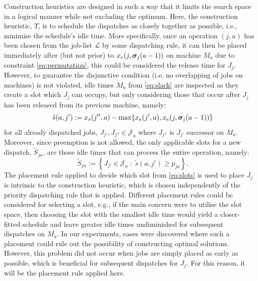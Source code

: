 \documentclass[twocolumn]{svjour3}
\begin{document}
Construction heuristics are designed in such a way that it limits the search 
space in a logical manner while not excluding the optimum. Here, the 
construction heuristic, $\Upsilon$, is to schedule the dispatches as closely 
together as possible, i.e., minimise the schedule's idle time. 
More specifically, once an operation $(j,a)$ has been chosen from the job-list 
$\mathcal{L}$ by some dispatching rule, it can then be placed immediately after 
(but not prior) to $x_e(j,\bm \sigma_j(a-1))$ on machine $M_a$ due to constraint 
\cref{eq:permutation}, this could be considered the release time for $J_j$. 
However, to guarantee the disjunctive condition (i.e. no overlapping of jobs on 
machines) is not violated, idle times $M_a$ from \cref{eq:slack} are inspected 
as they create a slot which $J_j$ can occupy, but only considering those that 
occur after $J_j$ has been released from its previous machine, namely:
\begin{equation}\quad
\tilde{s}(a,j'):= x_s(j'',a)-\max\{x_e(j',a),x_e(j,\bm \sigma_j(a-1))\} 
\end{equation}
for all already dispatched jobs, $J_{j'},J_{j''}\in \mathcal{J}_a$ where 
$J_{j''}$ is $J_{j'}$ successor on $M_a$. Moreover, since preemption is not 
allowed, the only applicable slots for a new dispatch, $\tilde{S}_{ja}$, are 
those idle times that can process the entire operation, namely:
\begin{equation}\quad
\tilde{S}_{ja} := 
\left\{J_{j'}\in \mathcal{J}_a \;:\; \tilde{s}(a,j')\geq p_{ja} \right\}
\label{eq:slots}. \end{equation} 
The placement rule applied to decide which slot from \cref{eq:slots} is used to 
place $J_j$ is intrinsic to the construction heuristic, which is chosen 
independently of the priority dispatching rule that is applied. 
Different placement rules could be considered for selecting a slot, e.g., if 
the main concern were to utilise the slot space, then choosing the slot with 
the smallest idle time would yield a closer-fitted schedule and leave greater 
idle times undiminished for subsequent dispatches on $M_a$.
In our experiments, cases were discovered where such a placement could rule out 
the possibility of constructing optimal solutions.
However, this problem did not occur when jobs are simply placed as early as 
possible, which is beneficial for subsequent dispatches for $J_j$. 
For this reason, it will be the placement rule applied here.
\end{document}
